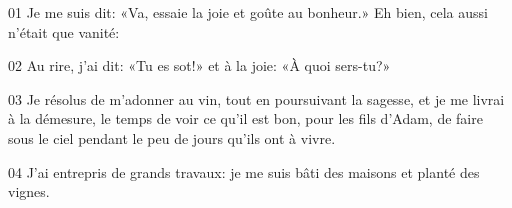 01 Je me suis dit: «Va, essaie la joie et goûte au bonheur.» Eh bien, cela aussi n’était que vanité:

02 Au rire, j’ai dit: «Tu es sot!» et à la joie: «À quoi sers-tu?»

03 Je résolus de m’adonner au vin, tout en poursuivant la sagesse, et je me livrai à la démesure, le temps de voir ce qu’il est bon, pour les fils d’Adam, de faire sous le ciel pendant le peu de jours qu’ils ont à vivre.

04 J’ai entrepris de grands travaux: je me suis bâti des maisons et planté des vignes.
